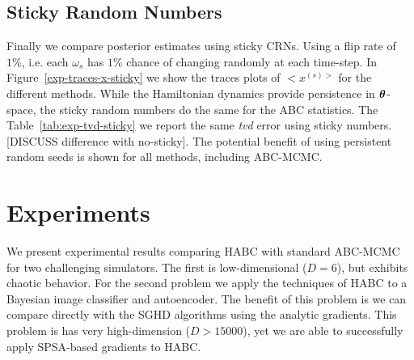 \documentclass[]{article}
\begin{document}
%




\subsection{Sticky Random Numbers}
Finally we compare posterior estimates using sticky CRNs.  Using a flip rate of $1\%$, i.e. each $\omega_s$ has $1\%$ chance of changing randomly at each time-step.  In Figure~\ref{exp-traces-x-sticky} we show the traces plots of $<x^{(s)>}$ for the different methods.  While the Hamiltonian dynamics provide persistence in ${\bm \theta}$-space, the sticky random numbers do the same for the ABC statistics.  The Table~\ref{tab:exp-tvd-sticky} we report the same {\em tvd} error using sticky numbers.  [DISCUSS difference with no-sticky]. The potential benefit of using persistent random seeds is shown for all methods, including ABC-MCMC.


\section{Experiments}\label{sec:experiments}
We present experimental results comparing HABC with standard ABC-MCMC for two challenging simulators.  The first is low-dimensional ($D=6$), but exhibits chaotic behavior.  For the second problem we apply the techniques of HABC to a Bayesian image classifier and autoencoder.  The benefit of this problem is we can compare directly with the SGHD algorithms using the analytic gradients.  This problem is has very high-dimension ($D>15000$), yet we are able to successfully apply SPSA-based gradients to HABC. 
\end{document}
